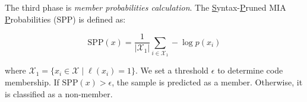 The third phase is \textit{member probabilities calculation}. The \underline{S}yntax-\underline{P}runed MIA \underline{P}robabilities (SPP) is defined as:

\begin{equation}
\text{SPP}(x)=\frac{1}{|\mathcal{X}_{1}|}\sum_{i \in \mathcal{X}_{1}} -\log p(x_i)  
\end{equation}

where $ \mathcal{X}_1 = \{x_i \in \mathcal{X} \mid \ell(x_i) = 1\} $. We set a threshold $\epsilon$ to determine code membership. If $\text{SPP}(x) > \epsilon$, the sample is predicted as a member. Otherwise, it is classified as a non-member.








